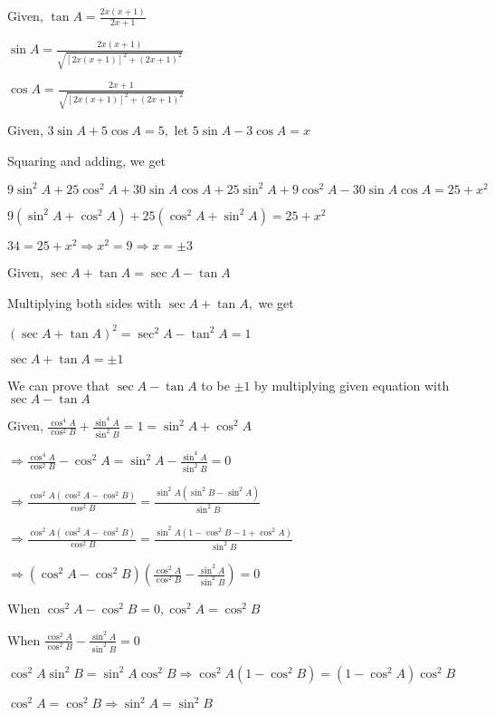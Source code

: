 \item Given, $\tan A = \frac{2x(x + 1)}{2x + 1}$

    $\sin A = \frac{2x(x + 1)}{\sqrt{[2x(x + 1)]^2 + (2x + 1)^2}}$

    $\cos A = \frac{2x + 1}{\sqrt{[2x(x + 1)]^2 + (2x + 1)^2}}$

\item Given, $3\sin A + 5\cos A = 5,$ let $5\sin A - 3\cos A = x$

    Squaring and adding, we get

    $9\sin^2A + 25\cos^2A + 30\sin A\cos A + 25\sin^2A + 9\cos^2A - 30\sin A\cos A = 25 + x^2$

    $9(\sin^2A + \cos^2A) + 25(\cos^2A + \sin^2A) = 25 + x^2$

    $34 = 25 + x^2 \Rightarrow x^2 = 9 \Rightarrow x = \pm 3$

\item Given, $\sec A + \tan A = \sec A - \tan A$

    Multiplying both sides with $\sec A + \tan A,$ we get

    $(\sec A + \tan A)^2 = \sec^2A - \tan^2A = 1$

    $\sec A + \tan A = \pm 1$

    We can prove that $\sec A - \tan A$ to be $\pm 1$ by multiplying given equation with $\sec A - \tan A$

\item Given, $\frac{\cos^4 A}{\cos^2 B} + \frac{\sin^4 A}{\sin^2 B} = 1 = \sin^2A + \cos^2A$

    $\Rightarrow \frac{\cos^4 A}{\cos^2 B} - \cos^2A = \sin^2A - \frac{\sin^4A}{\sin^2B} = 0$

    $\Rightarrow \frac{\cos^2A(\cos^2A - \cos^2B)}{\cos^2B} = \frac{\sin^2A(\sin^2B - \sin^2A)}{\sin^2B}$

    $\Rightarrow \frac{\cos^2A(\cos^2A - \cos^2B)}{\cos^2B} = \frac{\sin^2A(1 - \cos^2B - 1 + \cos^2A)}{\sin^2B}$

    $\Rightarrow (\cos^2A - \cos^2B )\left(\frac{\cos^2A}{\cos^2B} - \frac{\sin^2A}{\sin^2B}\right) = 0$

    When $\cos^2A - \cos^2B = 0, \cos^2A = \cos^2B$

    When $\frac{\cos^2A}{\cos^2B} - \frac{\sin^2A}{\sin^2B} = 0$

    $\cos^2A\sin^2B = \sin^2A\cos^2B \Rightarrow \cos^2A(1 - \cos^2B) = (1 - \cos^2A)\cos^2B$

    $\cos^2A = \cos^2B \Rightarrow \sin^2A = \sin^2B$

